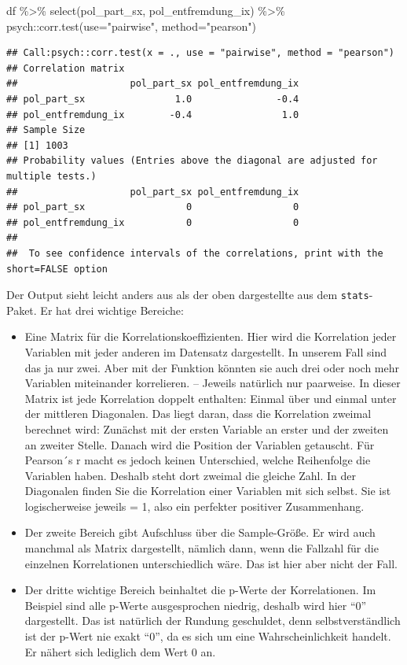 \documentclass[
]{book}
\newenvironment{Shaded}{\begin{snugshade}}{\end{snugshade}}
\newcommand{\AttributeTok}[1]{\textcolor[rgb]{0.77,0.63,0.00}{#1}}
\newcommand{\FunctionTok}[1]{\textcolor[rgb]{0.00,0.00,0.00}{#1}}
\newcommand{\NormalTok}[1]{#1}
\newcommand{\SpecialCharTok}[1]{\textcolor[rgb]{0.00,0.00,0.00}{#1}}
\newcommand{\StringTok}[1]{\textcolor[rgb]{0.31,0.60,0.02}{#1}}
\begin{document}
\begin{Shaded}
\begin{Highlighting}[]
\NormalTok{df }\SpecialCharTok{\%\textgreater{}\%}
  \FunctionTok{select}\NormalTok{(pol\_part\_sx, pol\_entfremdung\_ix) }\SpecialCharTok{\%\textgreater{}\%} 
\NormalTok{  psych}\SpecialCharTok{::}\FunctionTok{corr.test}\NormalTok{(}\AttributeTok{use=}\StringTok{"pairwise"}\NormalTok{, }\AttributeTok{method=}\StringTok{"pearson"}\NormalTok{)}
\end{Highlighting}
\end{Shaded}

\begin{verbatim}
## Call:psych::corr.test(x = ., use = "pairwise", method = "pearson")
## Correlation matrix 
##                    pol_part_sx pol_entfremdung_ix
## pol_part_sx                1.0               -0.4
## pol_entfremdung_ix        -0.4                1.0
## Sample Size 
## [1] 1003
## Probability values (Entries above the diagonal are adjusted for multiple tests.) 
##                    pol_part_sx pol_entfremdung_ix
## pol_part_sx                  0                  0
## pol_entfremdung_ix           0                  0
## 
##  To see confidence intervals of the correlations, print with the short=FALSE option
\end{verbatim}

Der Output sieht leicht anders aus als der oben dargestellte aus dem \texttt{stats}-Paket. Er hat drei wichtige Bereiche:

\begin{itemize}
\item
  Eine Matrix für die Korrelationskoeffizienten. Hier wird die Korrelation jeder Variablen mit jeder anderen im Datensatz dargestellt. In unserem Fall sind das ja nur zwei. Aber mit der Funktion könnten sie auch drei oder noch mehr Variablen miteinander korrelieren. -- Jeweils natürlich nur paarweise. In dieser Matrix ist jede Korrelation doppelt enthalten: Einmal über und einmal unter der mittleren Diagonalen. Das liegt daran, dass die Korrelation zweimal berechnet wird: Zunächst mit der ersten Variable an erster und der zweiten an zweiter Stelle. Danach wird die Position der Variablen getauscht. Für Pearson´s r macht es jedoch keinen Unterschied, welche Reihenfolge die Variablen haben. Deshalb steht dort zweimal die gleiche Zahl. In der Diagonalen finden Sie die Korrelation einer Variablen mit sich selbst. Sie ist logischerweise jeweils = 1, also ein perfekter positiver Zusammenhang.
\item
  Der zweite Bereich gibt Aufschluss über die Sample-Größe. Er wird auch manchmal als Matrix dargestellt, nämlich dann, wenn die Fallzahl für die einzelnen Korrelationen unterschiedlich wäre. Das ist hier aber nicht der Fall.
\item
  Der dritte wichtige Bereich beinhaltet die p-Werte der Korrelationen. Im Beispiel sind alle p-Werte ausgesprochen niedrig, deshalb wird hier ``0'' dargestellt. Das ist natürlich der Rundung geschuldet, denn selbstverständlich ist der p-Wert nie exakt ``0'', da es sich um eine Wahrscheinlichkeit handelt. Er nähert sich lediglich dem Wert 0 an.
\end{itemize}
\end{document}
